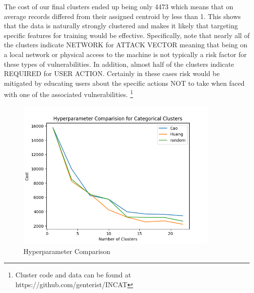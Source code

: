 \documentclass{article} %
\begin{document}
The cost of our final clusters ended up being only 4473 which means that on average records differed from their assigned centroid by less than 1.  This shows that the data is naturally strongly clustered and makes it likely that targeting specific features for training would be effective.  Specifically, note that nearly all of the clusters indicate NETWORK for ATTACK VECTOR meaning that being on a local network or physical access to the machine is not typically a risk factor for these types of vulnerabilities.  In addition, almost half of the clusters indicate REQUIRED for USER ACTION.  Certainly in these cases risk would be mitigated by educating users about the specific actions NOT to take when faced with one of the associated vulnerabilities.  
\footnote{Cluster code and data can be found at https://github.com/genterist/INCAT}

\begin{figure}[h]
  \centering
  \includegraphics[width=10cm]{images/Hyperparameter.png}
  \caption{Hyperparameter Comparison}
  \label{Figure:VulOntology}
\end{figure}
\end{document}
